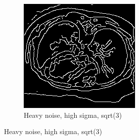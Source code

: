 \begin{figure}[H]
  \begin{subfigure}{.5\textwidth}
    \centering
    \includegraphics[width=.9\textwidth]{./edgedetection/heavy_noise/h_noise_h_sigma_sqr3}
    \caption{Heavy noise, high sigma, sqrt(3)}
    \label{fig:h_noise_h_sigma_sqr3}
  \end{subfigure}%
  
\end{figure}

